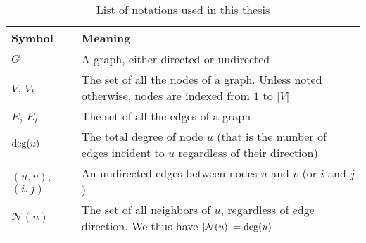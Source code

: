 \begin{table*}[htpb]
  \centering
  \caption{List of notations used in this thesis}\label{tab:notations}%
  \vspace{-.5\baselineskip}
  \begin{tabulary}{187mm}{LL}
    \toprule
    Symbol & Meaning \\
    \midrule
    $G$ & A graph, either directed or undirected \\
    $V$, $V_t$ & The set of all the nodes of a graph. Unless noted otherwise, nodes are indexed from $1$ to $|V|$ \\
    $E$, $E_t$ & The set of all the edges of a graph \\
    $\operatorname{deg}(u)$ & The total degree of node $u$ (that is the number of edges incident to $u$
    regardless of their direction) \\
    $(u,v)$, $(i,j)$ & An undirected edges between nodes $u$ and $v$ (or $i$ and $j$) \\
    $\mathcal{N}(u)$ & The set of all neighbors of $u$, regardless of edge direction. We thus have
    $|\mathcal{N}(u)| = \operatorname{deg}(u)$ \\
    \bottomrule
  \end{tabulary}
\end{table*}
